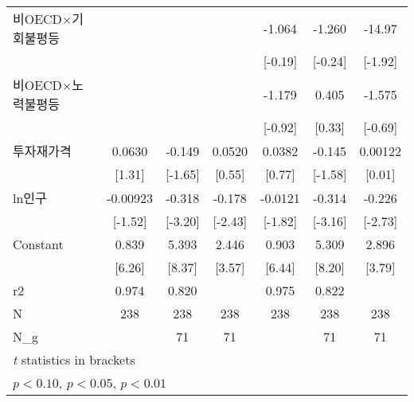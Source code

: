 \begin{table}[htbp]
\begin{tabular}{l*{6}{c}}
\addlinespace
비OECD$\times$기회불평등&                     &                     &                     &      -1.064         &      -1.260         &      -14.97\sym{*}  \\
                    &                     &                     &                     &     [-0.19]         &     [-0.24]         &     [-1.92]         \\
\addlinespace
비OECD$\times$노력불평등&                     &                     &                     &      -1.179         &       0.405         &      -1.575         \\
                    &                     &                     &                     &     [-0.92]         &      [0.33]         &     [-0.69]         \\
\addlinespace
투자재가격        &      0.0630         &      -0.149         &      0.0520         &      0.0382         &      -0.145         &     0.00122         \\
                    &      [1.31]         &     [-1.65]         &      [0.55]         &      [0.77]         &     [-1.58]         &      [0.01]         \\
\addlinespace
ln인구            &    -0.00923         &      -0.318\sym{***}&      -0.178\sym{**} &     -0.0121\sym{*}  &      -0.314\sym{***}&      -0.226\sym{***}\\
                    &     [-1.52]         &     [-3.20]         &     [-2.43]         &     [-1.82]         &     [-3.16]         &     [-2.73]         \\
\addlinespace
Constant            &       0.839\sym{***}&       5.393\sym{***}&       2.446\sym{***}&       0.903\sym{***}&       5.309\sym{***}&       2.896\sym{***}\\
                    &      [6.26]         &      [8.37]         &      [3.57]         &      [6.44]         &      [8.20]         &      [3.79]         \\
\midrule
r2                  &       0.974         &       0.820         &                     &       0.975         &       0.822         &                     \\
N                   &         238         &         238         &         238         &         238         &         238         &         238         \\
N\_g                 &                     &          71         &          71         &                     &          71         &          71         \\
\bottomrule
\multicolumn{7}{l}{\footnotesize \textit{t} statistics in brackets}\\
\multicolumn{7}{l}{\footnotesize \sym{*} \(p<0.10\), \sym{**} \(p<0.05\), \sym{***} \(p<0.01\)}\\
\end{tabular}
\end{table}

